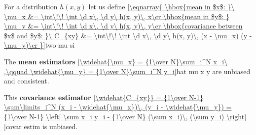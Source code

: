 For a distribution $h(x, y)$ let us define
\eqref{\eqnarray{
\hbox{mean in $x$: }\ \mu_x &= \int\!\! \int \d x\, \d y\ h(x, y)\, x\cr
\hbox{mean in $y$: } \mu_y &= \int\!\! \int \d x\, \d y\ h(x, y)\, y\cr
\hbox{covariance between $x$ and $y$: }\ C_{xy} &= \int\!\! \int \d x\, \d y\ h(x, y)\, (x - \mu_x) (y - \mu_y)\cr
}}{two mu si}

The {\bf mean estimators}
\eqref{\widehat{\mu_x} = {1\over N}\sum_i^N x_i\ ,\qquad \widehat{\mu_y} = {1\over N}\sum_i^N y_i}{hat mu x y}
are unbiased and consistent.

This {\bf covariance estimator}
\eqref{\widehat{C_{xy}}
	= {1\over N-1} \sum\limits_i^N (x_i - \widehat{\mu_x})\, (y_i - \widehat{\mu_y})
	= {1\over N-1} \left[ \sum x_i y_i - {1\over N} (\sum x_i)\, (\sum y_i) \right]
}{covar estim}
is unbiased.

\bye
